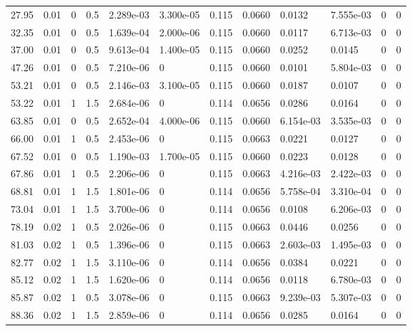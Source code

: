 \documentclass[preview]{standalone}
\begin{document}
{{\begin{tabular}{L{1.2cm}C{1.2cm} C{0.3cm}C{0.5cm} C{1.4cm}C{1.4cm} C{1.4cm}C{1.4cm} C{1.6cm}C{1.6cm} C{1.6cm}C{1.6cm}}
  27.95  &  0.01  & 0     & 0.5 &  2.289e-03  & 3.300e-05  &  0.115&   0.0660& 0.0132 & 7.555e-03   &  0 & 0  \\ 
  32.35  &  0.01  & 0     & 0.5 &  1.639e-04  & 2.000e-06  &  0.115&   0.0660& 0.0117 & 6.713e-03   &  0 & 0  \\ 
  37.00  &  0.01  & 0     & 0.5 &  9.613e-04  & 1.400e-05  &  0.115&   0.0660& 0.0252 & 0.0145   &  0 & 0  \\ 
  47.26  &  0.01  & 0     & 0.5 &  7.210e-06  & 0  &  0.115&   0.0660& 0.0101 & 5.804e-03   &  0 & 0  \\ 
  53.21  &  0.01  & 0     & 0.5 &  2.146e-03  & 3.100e-05  &  0.115&   0.0660& 0.0187 & 0.0107   &  0 & 0  \\ 
  53.22  &  0.01  & 1     & 1.5 &  2.684e-06  & 0  &  0.114&   0.0656& 0.0286 & 0.0164   &  0 & 0  \\ 
  63.85  &  0.01  & 0     & 0.5 &  2.652e-04  & 4.000e-06  &  0.115&   0.0660& 6.154e-03 & 3.535e-03   &  0 & 0  \\ 
  66.00  &  0.01  & 1     & 0.5 &  2.453e-06  & 0  &  0.115&   0.0663& 0.0221 & 0.0127   &  0 & 0  \\ 
  67.52  &  0.01  & 0     & 0.5 &  1.190e-03  & 1.700e-05  &  0.115&   0.0660& 0.0223 & 0.0128   &  0 & 0  \\ 
  67.86  &  0.01  & 1     & 0.5 &  2.206e-06  & 0  &  0.115&   0.0663& 4.216e-03 & 2.422e-03   &  0 & 0  \\ 
  68.81  &  0.01  & 1     & 1.5 &  1.801e-06  & 0  &  0.114&   0.0656& 5.758e-04 & 3.310e-04   &  0 & 0  \\ 
  73.04  &  0.01  & 1     & 1.5 &  3.700e-06  & 0  &  0.114&   0.0656& 0.0108 & 6.206e-03   &  0 & 0  \\ 
  78.19  &  0.02  & 1     & 0.5 &  2.026e-06  & 0  &  0.115&   0.0663& 0.0446 & 0.0256   &  0 & 0  \\ 
  81.03  &  0.02  & 1     & 0.5 &  1.396e-06  & 0  &  0.115&   0.0663& 2.603e-03 & 1.495e-03   &  0 & 0  \\ 
  82.77  &  0.02  & 1     & 1.5 &  3.110e-06  & 0  &  0.114&   0.0656& 0.0384 & 0.0221   &  0 & 0  \\ 
  85.12  &  0.02  & 1     & 1.5 &  1.620e-06  & 0  &  0.114&   0.0656& 0.0118 & 6.780e-03   &  0 & 0  \\ 
  85.87  &  0.02  & 1     & 0.5 &  3.078e-06  & 0  &  0.115&   0.0663& 9.239e-03 & 5.307e-03   &  0 & 0  \\ 
  88.36  &  0.02  & 1     & 1.5 &  2.859e-06  & 0  &  0.114&   0.0656& 0.0285 & 0.0164   &  0 & 0  \\ 

\end{tabular}}}
\end{document}
